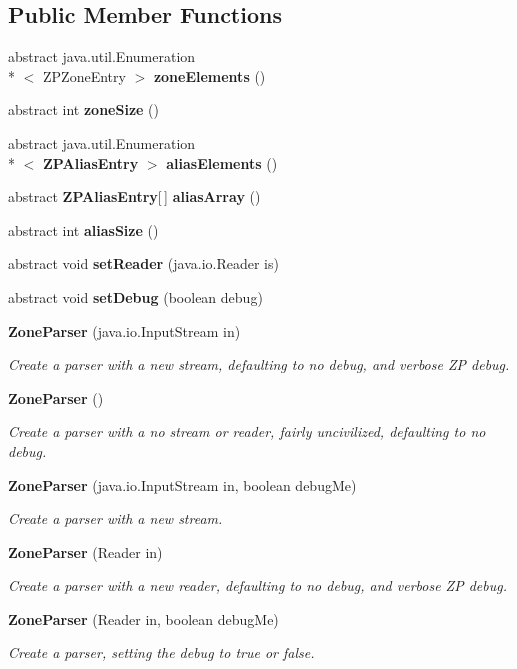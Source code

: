 \subsection*{Public Member Functions}
\begin{DoxyCompactItemize}
\item 
abstract java.\-util.\-Enumeration\\*
$<$ Z\-P\-Zone\-Entry $>$ {\bf zone\-Elements} ()
\item 
abstract int {\bf zone\-Size} ()
\item 
abstract java.\-util.\-Enumeration\\*
$<$ {\bf Z\-P\-Alias\-Entry} $>$ {\bf alias\-Elements} ()
\item 
abstract {\bf Z\-P\-Alias\-Entry}[$\,$] {\bf alias\-Array} ()
\item 
abstract int {\bf alias\-Size} ()
\item 
abstract void {\bf set\-Reader} (java.\-io.\-Reader is)
\item 
abstract void {\bf set\-Debug} (boolean debug)
\item 
{\bf Zone\-Parser} (java.\-io.\-Input\-Stream in)
\begin{DoxyCompactList}\small\item\em Create a parser with a new stream, defaulting to no debug, and verbose Z\-P debug. \end{DoxyCompactList}\item 
{\bf Zone\-Parser} ()
\begin{DoxyCompactList}\small\item\em Create a parser with a no stream or reader, fairly uncivilized, defaulting to no debug. \end{DoxyCompactList}\item 
{\bf Zone\-Parser} (java.\-io.\-Input\-Stream in, boolean debug\-Me)
\begin{DoxyCompactList}\small\item\em Create a parser with a new stream. \end{DoxyCompactList}\item 
{\bf Zone\-Parser} (Reader in)
\begin{DoxyCompactList}\small\item\em Create a parser with a new reader, defaulting to no debug, and verbose Z\-P debug. \end{DoxyCompactList}\item 
{\bf Zone\-Parser} (Reader in, boolean debug\-Me)
\begin{DoxyCompactList}\small\item\em Create a parser, setting the debug to true or false. \end{DoxyCompactList}\item 

\end{DoxyCompactItemize}
